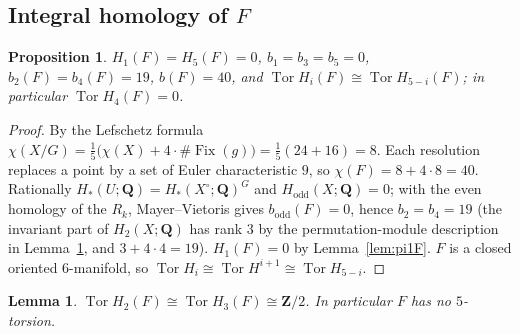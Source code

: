 \documentclass[11pt]{amsart}
\numberwithin{equation}{section}
\newtheorem{lemma}[theorem]{Lemma}
\newtheorem{proposition}[theorem]{Proposition}
\theoremstyle{definition}
\theoremstyle{remark}
\newcommand{\Z}{\mathbf Z}
\newcommand{\Q}{\mathbf Q}
\DeclareMathOperator{\Tor}{Tor}
\DeclareMathOperator{\Fix}{Fix}
\begin{document}
\subsection{Integral homology of $F$}\label{subsec:Fhom}

\begin{proposition}\label{prop:Fhom}
$H_1(F)=H_5(F)=0$, $b_1=b_3=b_5=0$, $b_2(F)=b_4(F)=19$, $b(F)=40$, and
$\Tor H_i(F)\cong\Tor H_{5-i}(F)$; in particular $\Tor H_4(F)=0$.
\end{proposition}

\begin{proof}
By the Lefschetz formula
$\chi(X/G)=\frac15\bigl(\chi(X)+4\cdot\#\Fix(g)\bigr)=\frac15(24+16)=8$.
Each resolution replaces a point by a set of Euler characteristic $9$,
so $\chi(F)=8+4\cdot8=40$. Rationally
$H_*(U;\Q)=H_*(X^\circ;\Q)^G$ and $H_{\mathrm{odd}}(X;\Q)=0$; with the
even homology of the $R_k$, Mayer--Vietoris gives $b_{\mathrm{odd}}(F)=0$,
hence $b_2=b_4=19$ (the invariant part of $H_2(X;\Q)$ has rank $3$ by the
permutation-module description in Lemma~\ref{lem:torF}, and
$3+4\cdot4=19$). $H_1(F)=0$ by Lemma~\ref{lem:pi1F}. $F$ is a closed
oriented $6$-manifold, so $\Tor H_i\cong\Tor H^{i+1}\cong\Tor H_{5-i}$.
\end{proof}

\begin{lemma}\label{lem:torF}
$\Tor H_2(F)\cong\Tor H_3(F)\cong\Z/2$. In particular $F$ has no
$5$-torsion.
\end{lemma}
\end{document}
